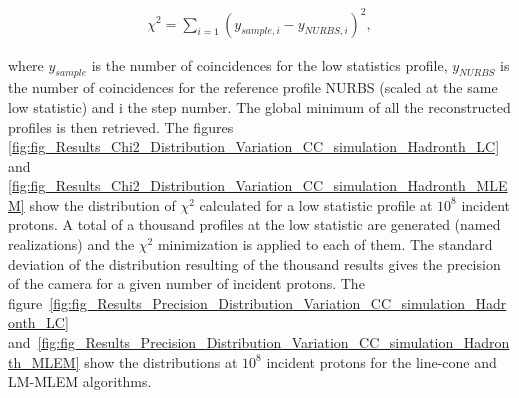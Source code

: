 \begin{eqnarray}
\chi^2 = \sum\limits_{i=1} {(y_{sample,i}-y_{NURBS,i})^2},
\end{eqnarray}

where $y_{sample}$ is the number of coincidences for the low statistics profile, $y_{NURBS}$ is the number of coincidences for the reference profile NURBS (scaled at the same low statistic) and i the step number.\newline
The global minimum of all the reconstructed profiles is then retrieved. The figures \ref{fig:fig_Results_Chi2_Distribution_Variation_CC_simulation_Hadronth_LC} and  \ref{fig:fig_Results_Chi2_Distribution_Variation_CC_simulation_Hadronth_MLEM} show the distribution of $\chi^2$ calculated for a low statistic profile at $10^8$ incident protons.\newline
A total of a thousand profiles at the low statistic are generated (named realizations) and the $\chi^2$ minimization is applied to each of them. The standard deviation of the distribution resulting of the thousand results gives the precision of the camera for a given number of incident protons. The figure~\ref{fig:fig_Results_Precision_Distribution_Variation_CC_simulation_Hadronth_LC} and~\ref{fig:fig_Results_Precision_Distribution_Variation_CC_simulation_Hadronth_MLEM} show the distributions at $10^8$ incident protons for the line-cone and LM-MLEM algorithms.


